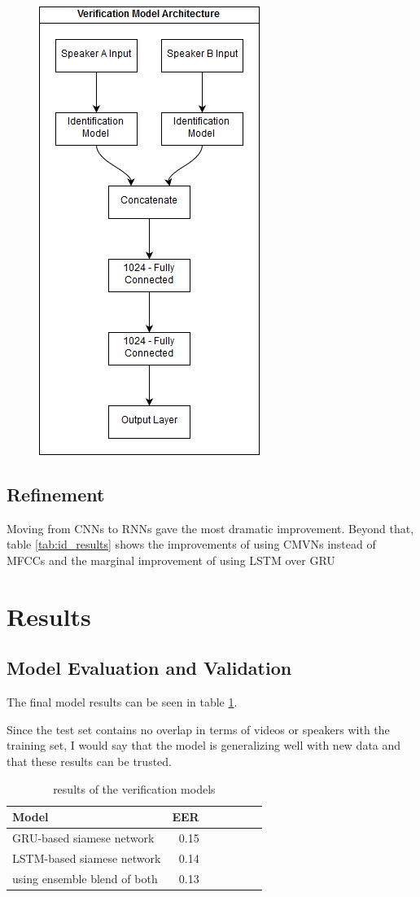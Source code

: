 \documentclass{article}
\begin{document}
\begin{figure}[H]
    \centering
    \includegraphics[scale=.65]{images/verification_model.png}
    \label{fig:ver_arch}
\end{figure}

\subsection{Refinement}
Moving from CNNs to RNNs gave the most dramatic improvement. Beyond that, table \ref{tab:id_results} shows the improvements of using CMVNs instead of MFCCs and the marginal improvement of using LSTM over GRU
\section{Results}
\subsection{Model Evaluation and Validation}
The final model results can be seen in table \ref{tab:ver_results}.

Since the test set contains no overlap in terms of videos or speakers with the training set, I would say that the model is generalizing well with new data and that these results can be trusted.
\begin{table}[H]
    \centering
    \begin{tabular}{l*{6}r}
        Model & EER\\
        \hline
        GRU-based siamese network & 0.15  \\
        LSTM-based siamese network & 0.14  \\
        using ensemble blend of both & 0.13  \\
    \end{tabular}
    \caption{results of the verification models}
    \label{tab:ver_results}
\end{table}
\end{document}
